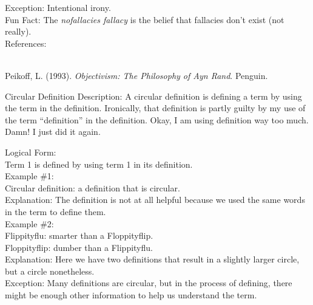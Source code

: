 \documentclass[a4paper,12pt,single,pdftex]{scrartcl}
\begin{document}
      
        Exception: Intentional irony.
      \\

      
        Fun Fact: The {\em nofallacies fallacy} is the belief that fallacies don't exist (not really).
      \\

    
    References:

    
      
        
      \\

      
        
          Peikoff, L. (1993). {\it Objectivism: The Philosophy of Ayn Rand}. Penguin.
        
      
    
  

Circular Definition
    Description: A circular definition is defining a term by using the term in the definition.  Ironically, that definition is partly guilty by my use of the term “definition” in the definition.  Okay, I am using definition way too much. Damn!  I just did it again.

    
      Logical Form:
    \\

    
      Term 1 is defined by using term 1 in its definition.
    \\

    
      Example \#1:
    \\

    
       Circular definition: a definition that is circular.
    \\

    
      Explanation: The definition is not at all helpful because we used the same words in the term to define them.
    \\

    
      Example \#2:
    \\

    
      Flippityflu: smarter than a Floppityflip.
    \\

    
      Floppityflip: dumber than a Flippityflu.
    \\

    
      Explanation: Here we have two definitions that result in a slightly larger circle, but a circle nonetheless.
    \\

    
      Exception: Many definitions are circular, but in the process of defining, there might be enough other information to help us understand the term.
    \\
\end{document}
